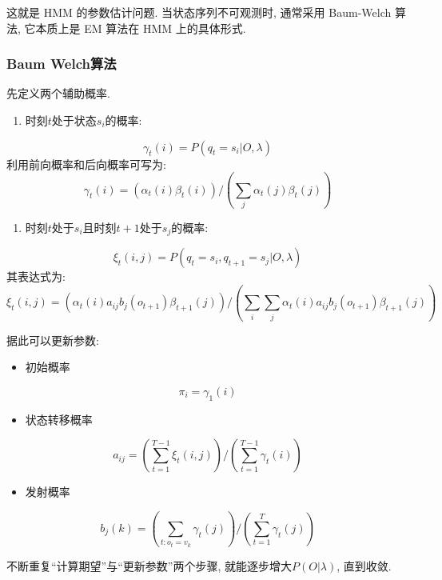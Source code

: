 这就是 HMM 的参数估计问题.
当状态序列不可观测时, 通常采用 Baum-Welch 算法, 它本质上是 EM 算法在 HMM 上的具体形式.

\subsubsection{Baum Welch算法}


先定义两个辅助概率.

\begin{enumerate}
\item[1.] 时刻$t$处于状态$s_i$的概率:
\end{enumerate}
\[
\gamma_t (i) = P(q_t = s_i | O, \lambda)
\]
利用前向概率和后向概率可写为:
\[
\gamma_t (i) = (\alpha_t (i) \beta_t (i)) / (\sum_j \alpha_t (j) \beta_t (j))
\]

\begin{enumerate}
\item[2.] 时刻$t$处于$s_i$且时刻$t+1$处于$s_j$的概率:
\end{enumerate}
\[
\xi_t (i, j) = P(q_t = s_i, q_{t+1} = s_j | O, \lambda)
\]
其表达式为:
\[
\xi_t (i, j) =
    (\alpha_t (i) a_{i j} b_j (o_{t+1}) \beta_{t+1}(j))
    /
    (\sum_i \sum_j \alpha_t (i) a_{i j} b_j (o_{t+1}) \beta_{t+1}(j))
\]

据此可以更新参数:

\begin{itemize}
\item 初始概率
\end{itemize}
\[
\pi_i = \gamma_1(i)
\]

\begin{itemize}
\item 状态转移概率
\end{itemize}
\[
a_{i j} = (\sum_{t=1}^{T-1} \xi_t (i, j)) / (\sum_{t=1}^{T-1} \gamma_t (i))
\]

\begin{itemize}
\item 发射概率
\end{itemize}
\[
b_j(k) =
    (\sum_{t:o_t=v_k} \gamma_t (j))
    /
    (\sum_{t=1}^T \gamma_t (j))
\]

不断重复“计算期望”与“更新参数”两个步骤, 就能逐步增大$P(O | \lambda)$, 直到收敛.
